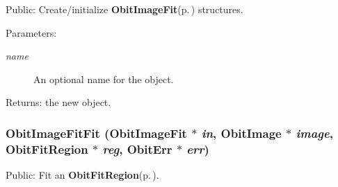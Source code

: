 Public: Create/initialize {\bf Obit\-Image\-Fit}{\rm (p.\,\pageref{structObitImageFit})} structures. 

\begin{Desc}
\item[Parameters:]
\begin{description}
\item[{\em name}]An optional name for the object. \end{description}
\end{Desc}
\begin{Desc}
\item[Returns:]the new object. \end{Desc}
\subsubsection{ Obit\-Image\-Fit\-Fit ({\bf Obit\-Image\-Fit} $\ast$ {\em in}, {\bf Obit\-Image} $\ast$ {\em image}, {\bf Obit\-Fit\-Region} $\ast$ {\em reg}, {\bf Obit\-Err} $\ast$ {\em err})}\label{ObitImageFit_8h_a8}


Public: Fit an {\bf Obit\-Fit\-Region}{\rm (p.\,\pageref{structObitFitRegion})}. 

